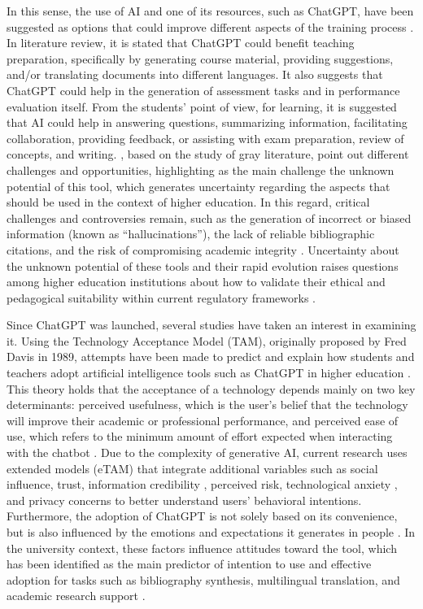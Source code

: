\documentclass[english]{textolivre}
\begin{document}
In this sense, the use of AI and one of its resources, such as ChatGPT, have been suggested as options that could improve different aspects of the training process \cite{lo2023impact}. In  literature review, it is stated that ChatGPT could benefit teaching preparation, specifically by generating course material, providing suggestions, and/or translating documents into different languages. It also suggests that ChatGPT could help in the generation of assessment tasks and in performance evaluation itself. From the students’ point of view, for learning, it is suggested that AI could help in answering questions, summarizing information, facilitating collaboration, providing feedback, or assisting with exam preparation, review of concepts, and writing. \textcite{neumann2023chatgpt}, based on the study of gray literature, point out different challenges and opportunities, highlighting as the main challenge the unknown potential of this tool, which generates uncertainty regarding the aspects that should be used in the context of higher education. In this regard, critical challenges and controversies remain, such as the generation of incorrect or biased information (known as “hallucinations”), the lack of reliable bibliographic citations, and the risk of compromising academic integrity \cite{marinas2025tam,unesco2024chatgpt}. Uncertainty about the unknown potential of these tools and their rapid evolution raises questions among higher education institutions about how to validate their ethical and pedagogical suitability within current regulatory frameworks \cite{unesco2024chatgpt}.

Since ChatGPT was launched, several studies have taken an interest in examining it. Using the Technology Acceptance Model (TAM), originally proposed by Fred Davis in 1989, attempts have been made to predict and explain how students and teachers adopt artificial intelligence tools such as ChatGPT in higher education \cite{aguilos2024chatgpt,barakat2025educators,marinas2025tam}. This theory holds that the acceptance of a technology depends mainly on two key determinants: perceived usefulness, which is the user’s belief that the technology will improve their academic or professional performance, and perceived ease of use, which refers to the minimum amount of effort expected when interacting with the chatbot \cite{davis1989tam}. Due to the complexity of generative AI, current research uses extended models (eTAM) that integrate additional variables such as social influence, trust, information credibility \cite{marinas2025tam}, perceived risk, technological anxiety \cite{barakat2025educators}, and privacy concerns \cite{kelly2025healthcare} to better understand users’ behavioral intentions. Furthermore, the adoption of ChatGPT is not solely based on its convenience, but is also influenced by the emotions and expectations it generates in people \cite{lee2024chatgpt}. In the university context, these factors influence attitudes toward the tool, which has been identified as the main predictor of intention to use and effective adoption for tasks such as bibliography synthesis, multilingual translation, and academic research support \cite{aguilos2024chatgpt,zou2023acceptance}.
\end{document}
